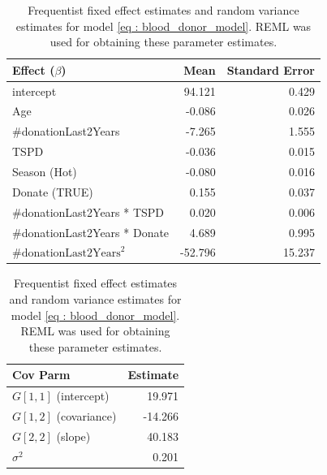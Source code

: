 \begin{table}[!htb]
\centering
\caption{Frequentist fixed effect estimates and random variance estimates for model \ref{eq : blood_donor_model}. REML was used for obtaining these parameter estimates.}
\label{table : frequentist_fixed effects}
\begin{tabular}{@{}lrr@{}}
\toprule
Effect ($\beta$) & Mean & Standard Error \\ \midrule
intercept & 94.121 & 0.429 \\
Age & -0.086 & 0.026 \\
\#donationLast2Years & -7.265 & 1.555 \\
TSPD & -0.036 & 0.015 \\
Season (Hot) & -0.080 & 0.016 \\
Donate (TRUE) & 0.155 & 0.037 \\
\#donationLast2Years * TSPD & 0.020 & 0.006 \\
\#donationLast2Years * Donate & 4.689 & 0.995 \\
$\text{\#donationLast2Years}^2$ & -52.796 & 15.237 \\ \bottomrule
\end{tabular}

\begin{tabular}{@{}lr@{}}
\toprule
Cov Parm & Estimate \\ \midrule
$G[1,1]$ (intercept) & 19.971 \\
$G[1,2]$ (covariance) & -14.266 \\
$G[2,2]$ (slope) & 40.183 \\
$\sigma^2$ & 0.201 \\ \bottomrule
\end{tabular}
\end{table}

